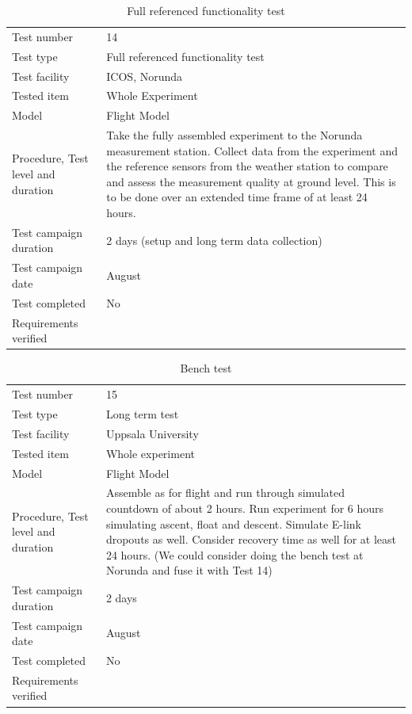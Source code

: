 \begin{table}[H]
\centering
\caption{Full referenced functionality test}
\label{tab:test14}
\begin{tabular}{L{5cm}L{10cm}}
\toprule
Test number & 14 \\
Test type & Full referenced functionality test \\
Test facility & ICOS, Norunda \\
Tested item & Whole Experiment \\
Model & Flight Model \\
Procedure, Test level and duration & Take the fully assembled experiment to the Norunda measurement station. Collect data from the experiment and the reference sensors from the weather station to compare and assess the measurement quality at ground level. This is to be done over an extended time frame of at least 24 hours. \\
Test campaign duration & 2 days (setup and long term data collection) \\
Test campaign date & August \\
Test completed & No \\
Requirements verified & \\
\bottomrule
\end{tabular}
\end{table}

\begin{table}[H]
\centering
\caption{Bench test}
\label{tab:test_bench}
\begin{tabular}{L{5cm}L{10cm}}
\toprule
Test number & 15 \\
Test type & Long term test \\
Test facility & Uppsala University \\
Tested item & Whole experiment \\
Model & Flight Model \\
Procedure, Test level and duration & Assemble as for flight and run through simulated countdown of about 2 hours. Run experiment for 6 hours simulating ascent, float and descent. Simulate E-link dropouts as well. Consider recovery time as well for at least 24 hours. (We could consider doing the bench test at Norunda and fuse it with Test 14) \\
Test campaign duration & 2 days \\
Test campaign date & August \\
Test completed & No \\
Requirements verified & \\
\bottomrule
\end{tabular}
\end{table}


